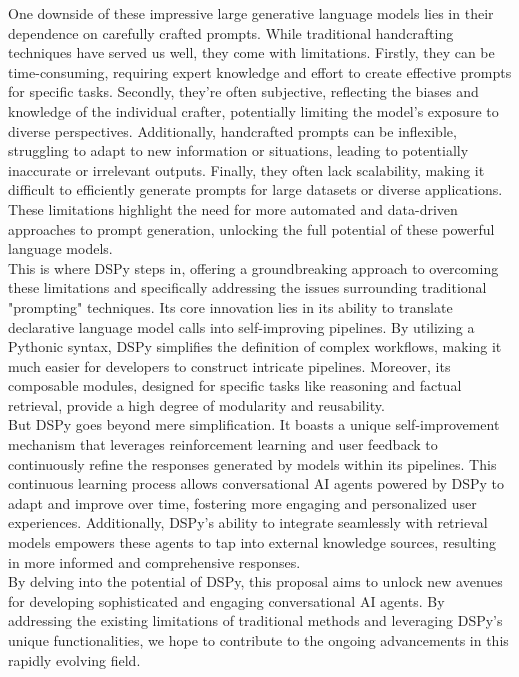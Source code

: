 One downside of these impressive large generative language models lies in their dependence on carefully crafted prompts. While traditional handcrafting techniques have served us well, they come with limitations. Firstly, they can be time-consuming, requiring expert knowledge and effort to create effective prompts for specific tasks. Secondly, they're often subjective, reflecting the biases and knowledge of the individual crafter, potentially limiting the model's exposure to diverse perspectives. Additionally, handcrafted prompts can be inflexible, struggling to adapt to new information or situations, leading to potentially inaccurate or irrelevant outputs. Finally, they often lack scalability, making it difficult to efficiently generate prompts for large datasets or diverse applications. These limitations highlight the need for more automated and data-driven approaches to prompt generation, unlocking the full potential of these powerful language models.
\\

This is where DSPy steps in, offering a groundbreaking approach to overcoming these limitations and specifically addressing the issues surrounding traditional "prompting" techniques. Its core innovation lies in its ability to translate declarative language model calls into self-improving pipelines. By utilizing a Pythonic syntax, DSPy simplifies the definition of complex workflows, making it much easier for developers to construct intricate pipelines. Moreover, its composable modules, designed for specific tasks like reasoning and factual retrieval, provide a high degree of modularity and reusability.
\\

But DSPy goes beyond mere simplification. It boasts a unique self-improvement mechanism that leverages reinforcement learning and user feedback to continuously refine the responses generated by models within its pipelines. This continuous learning process allows conversational AI agents powered by DSPy to adapt and improve over time, fostering more engaging and personalized user experiences. Additionally, DSPy's ability to integrate seamlessly with retrieval models empowers these agents to tap into external knowledge sources, resulting in more informed and comprehensive responses.
\\

By delving into the potential of DSPy, this proposal aims to unlock new avenues for developing sophisticated and engaging conversational AI agents. By addressing the existing limitations of traditional methods and leveraging DSPy's unique functionalities, we hope to contribute to the ongoing advancements in this rapidly evolving field.

